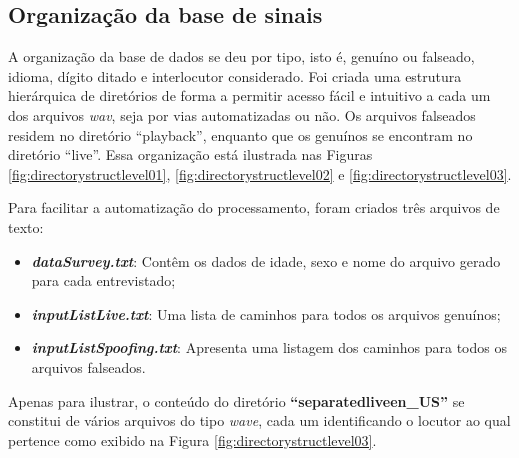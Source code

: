 	    \subsection{Organização da base de sinais}
		\par A organização da base de dados se deu por tipo, isto é, genuíno ou falseado, idioma, dígito ditado e interlocutor considerado. Foi criada uma estrutura hierárquica de diretórios de forma a permitir acesso fácil e intuitivo a cada um dos arquivos \textit{wav}, seja por vias automatizadas ou não. Os arquivos falseados residem no diretório ``playback'', enquanto que os genuínos se encontram no diretório ``live''.	Essa organização está ilustrada nas Figuras \ref{fig:directorystructlevel01}, \ref{fig:directorystructlevel02} e \ref{fig:directorystructlevel03}.\\
		
		\par Para facilitar a automatização do processamento, foram criados três arquivos de texto:
		\begin{itemize}
			\item \textit{\textbf{dataSurvey.txt}}: Contêm os dados de idade, sexo e nome do arquivo gerado para cada entrevistado;
			\item \textit{\textbf{inputListLive.txt}}: Uma lista de caminhos para todos os arquivos genuínos;
			\item \textit{\textbf{inputListSpoofing.txt}}: Apresenta uma listagem dos caminhos para todos os arquivos falseados.
		\end{itemize}
	
		\par Apenas para ilustrar, o conteúdo do diretório \textbf{``separated\textfractionsolidus live\textfractionsolidus en\_US''} se constitui de vários arquivos do tipo \textit{wave}, cada um identificando o locutor ao qual pertence como exibido na Figura \ref{fig:directorystructlevel03}.

